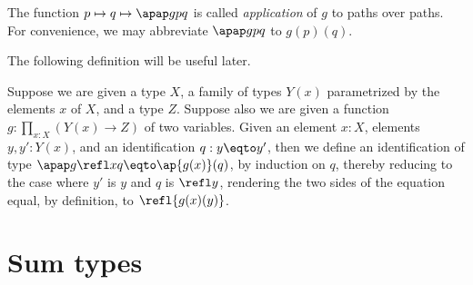 The function $p \mapsto q \mapsto \apap g p q$ is called \emph{application} of $g$ to paths over paths.
For convenience, we may abbreviate $\apap g p q$ to $g(p)(q)$.

The following definition will be useful later.

\begin{definition}\label{def:applfun2comp}
  Suppose we are given a type $X$, a family of types $Y(x)$ parametrized by the elements $x$ of $X$, and a type $Z$.  Suppose also we are given
  a function $g : \prod_{x:X} (Y(x) \to Z)$ of two variables.  Given an element $x:X$, elements $y, y':Y(x)$, and an identification $q : y \eqto y'$, then
  we define an identification of type $\apap g {\refl x} q \eqto \ap {g(x)}(q)$, by induction on $q$, thereby reducing to the case where $y'$ is
  $y$ and $q$ is $\refl y$, rendering the two sides of the equation equal, by definition, to $\refl {g(x)(y)}$.
\end{definition}

\section{Sum types}
\label{sec:sum-types}

